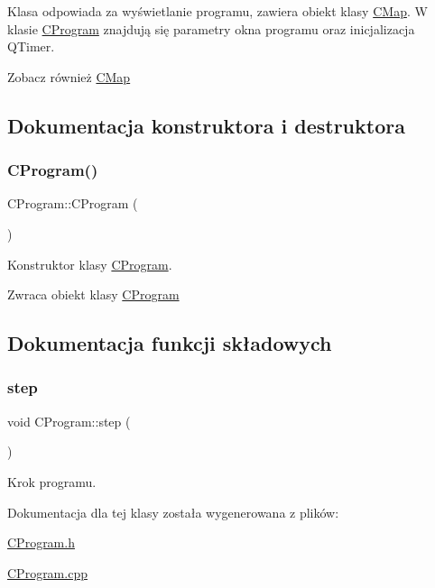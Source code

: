 Klasa odpowiada za wyświetlanie programu, zawiera obiekt klasy \mbox{\hyperlink{class_c_map}{C\+Map}}. W klasie \mbox{\hyperlink{class_c_program}{C\+Program}} znajdują się parametry okna programu oraz inicjalizacja Q\+Timer. \begin{DoxySeeAlso}{Zobacz również}
\mbox{\hyperlink{class_c_map}{C\+Map}} 
\end{DoxySeeAlso}


\subsection{Dokumentacja konstruktora i destruktora}
\mbox{\label{class_c_program_a74d3ca01d5e8b892f37684254ae546ed}} 
\subsubsection{\texorpdfstring{C\+Program()}{CProgram()}}
{\footnotesize\ttfamily C\+Program\+::\+C\+Program (\begin{DoxyParamCaption}{ }\end{DoxyParamCaption})}



Konstruktor klasy \mbox{\hyperlink{class_c_program}{C\+Program}}. 

\begin{DoxyReturn}{Zwraca}
obiekt klasy \mbox{\hyperlink{class_c_program}{C\+Program}} 
\end{DoxyReturn}


\subsection{Dokumentacja funkcji składowych}
\mbox{\label{class_c_program_a643bd73f256632b72a7d6182e8e7d807}} 
\subsubsection{\texorpdfstring{step}{step}}
{\footnotesize\ttfamily void C\+Program\+::step (\begin{DoxyParamCaption}{ }\end{DoxyParamCaption})\hspace{0.3cm}{\ttfamily [slot]}}



Krok programu. 



Dokumentacja dla tej klasy została wygenerowana z plików\+:\begin{DoxyCompactItemize}
\item 
\mbox{\hyperlink{_c_program_8h}{C\+Program.\+h}}\item 
\mbox{\hyperlink{_c_program_8cpp}{C\+Program.\+cpp}}\end{DoxyCompactItemize}
